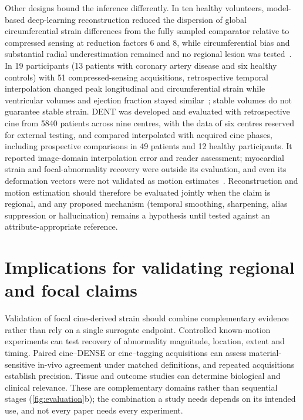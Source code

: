 Other designs bound the inference differently. In ten healthy volunteers, model-based deep-learning reconstruction reduced the dispersion of global circumferential strain differences from the fully sampled comparator relative to compressed sensing at reduction factors 6 and 8, while circumferential bias and substantial radial underestimation remained and no regional lesion was tested~\cite{tsuneta2025dlr}. In 19 participants (13 patients with coronary artery disease and six healthy controls) with 51 compressed-sensing acquisitions, retrospective temporal interpolation changed peak longitudinal and circumferential strain while ventricular volumes and ejection fraction stayed similar~\cite{grob2025interp}; stable volumes do not guarantee stable strain. DENT was developed and evaluated with retrospective cine from 5840 patients across nine centres, with the data of six centres reserved for external testing, and compared interpolated with acquired cine phases, including prospective comparisons in 49 patients and 12 healthy participants. It reported image-domain interpolation error and reader assessment; myocardial strain and focal-abnormality recovery were outside its evaluation, and even its deformation vectors were not validated as motion estimates~\cite{morales2024dent}. Reconstruction and motion estimation should therefore be evaluated jointly when the claim is regional, and any proposed mechanism (temporal smoothing, sharpening, alias suppression or hallucination) remains a hypothesis until tested against an attribute-appropriate reference.

\section{Implications for validating regional and focal claims}\label{sec:programme}

Validation of focal cine-derived strain should combine complementary evidence rather than rely on a single surrogate endpoint. Controlled known-motion experiments can test recovery of abnormality magnitude, location, extent and timing. Paired cine--DENSE or cine--tagging acquisitions can assess material-sensitive in-vivo agreement under matched definitions, and repeated acquisitions establish precision. Tissue and outcome studies can determine biological and clinical relevance. These are complementary domains rather than sequential stages (\cref{fig:evaluation}b); the combination a study needs depends on its intended use, and not every paper needs every experiment.

